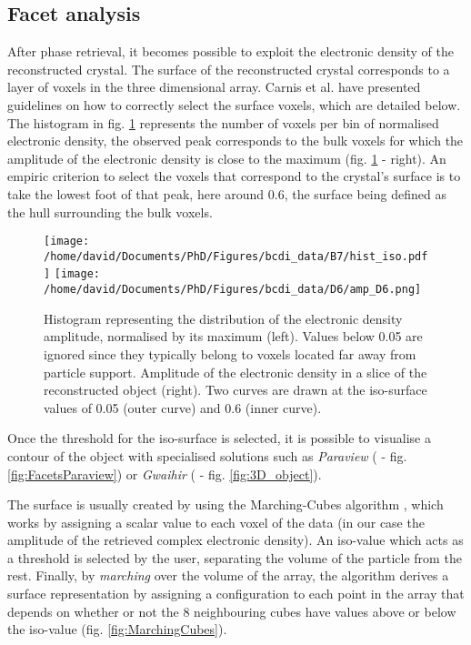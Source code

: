 \subsection{Facet analysis} \label{sec:FacetAnalysis}

After phase retrieval, it becomes possible to exploit the electronic density of the reconstructed crystal.
The surface of the reconstructed crystal corresponds to a layer of voxels in the three dimensional array.
Carnis et al. \parencite*{Carnis2019} have presented guidelines on how to correctly select the surface voxels, which are detailed below.
The histogram in fig. \ref{fig:histo} represents the number of voxels per bin of normalised electronic density, the observed peak corresponds to the bulk voxels for which the amplitude of the electronic density is close to the maximum (fig. \ref{fig:histo} - right).
An empiric criterion to select the voxels that correspond to the crystal's surface is to take the lowest foot of that peak, here around \num{0.6}, the surface being defined as the hull surrounding the bulk voxels.

\begin{figure}[!htb]
   \centering
   \texttt{[image: /home/david/Documents/PhD/Figures/bcdi\_data/B7/hist\_iso.pdf]}
   \texttt{[image: /home/david/Documents/PhD/Figures/bcdi\_data/D6/amp\_D6.png]}
   \caption{
   Histogram representing the distribution of the electronic density amplitude, normalised by its maximum (left).
   Values below 0.05 are ignored since they typically belong to voxels located far away from particle support.
   Amplitude of the electronic density in a slice of the reconstructed object (right).
   Two curves are drawn at the iso-surface values of \num{0.05} (outer curve) and \num{0.6} (inner curve).
   }
   \label{fig:histo}
\end{figure}

Once the threshold for the iso-surface is selected, it is possible to visualise a contour of the object with specialised solutions such as \textit{Paraview} (\cite{Ahrens2001} - fig. \ref{fig:FacetsParaview}) or \textit{Gwaihir} (\cite{Simonne2022} - fig. \ref{fig:3D_object}).

The surface is usually created by using the Marching-Cubes algorithm \parencite{Lorensen1987}, which works by assigning a scalar value to each voxel of the data (in our case the amplitude of the retrieved complex electronic density).
An iso-value which acts as a threshold is selected by the user, separating the volume of the particle from the rest.
Finally, by \textit{marching} over the volume of the array, the algorithm derives a surface representation by assigning a configuration to each point in the array that depends on whether or not the 8 neighbouring cubes have values above or below the iso-value (fig. \ref{fig:MarchingCubes}).

